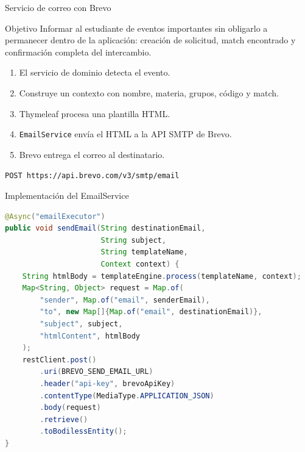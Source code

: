 \documentclass[aspectratio=169,11pt]{beamer}
\begin{document}
\begin{frame}{Servicio de correo con Brevo}
  \begin{block}{Objetivo}
    Informar al estudiante de eventos importantes sin obligarlo a permanecer
    dentro de la aplicación: creación de solicitud, match encontrado y
    confirmación completa del intercambio.
  \end{block}
  \begin{enumerate}
    \item El servicio de dominio detecta el evento.
    \item Construye un contexto con nombre, materia, grupos, código y match.
    \item Thymeleaf procesa una plantilla HTML.
    \item \texttt{EmailService} envía el HTML a la API SMTP de Brevo.
    \item Brevo entrega el correo al destinatario.
  \end{enumerate}
  \vspace{0.15cm}
  \texttt{POST https://api.brevo.com/v3/smtp/email}
\end{frame}

\begin{frame}[fragile]{Implementación del EmailService}
\begin{lstlisting}[language=Java]
@Async("emailExecutor")
public void sendEmail(String destinationEmail,
                      String subject,
                      String templateName,
                      Context context) {
    String htmlBody = templateEngine.process(templateName, context);
    Map<String, Object> request = Map.of(
        "sender", Map.of("email", senderEmail),
        "to", new Map[]{Map.of("email", destinationEmail)},
        "subject", subject,
        "htmlContent", htmlBody
    );
    restClient.post()
        .uri(BREVO_SEND_EMAIL_URL)
        .header("api-key", brevoApiKey)
        .contentType(MediaType.APPLICATION_JSON)
        .body(request)
        .retrieve()
        .toBodilessEntity();
}
\end{lstlisting}
\end{frame}
\end{document}
